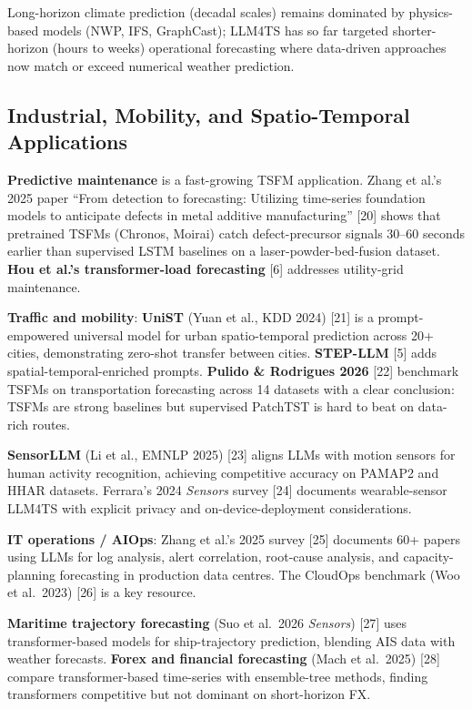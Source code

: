 Long-horizon climate prediction (decadal scales) remains dominated by physics-based models (NWP, IFS, GraphCast); LLM4TS has so far targeted shorter-horizon (hours to weeks) operational forecasting where data-driven approaches now match or exceed numerical weather prediction.

\subsection{Industrial, Mobility, and Spatio-Temporal Applications}\label{industrial-mobility-and-spatio-temporal-applications}

\textbf{Predictive maintenance} is a fast-growing TSFM application. Zhang et al.'s 2025 paper ``From detection to forecasting: Utilizing time-series foundation models to anticipate defects in metal additive manufacturing'' {[}20{]} shows that pretrained TSFMs (Chronos, Moirai) catch defect-precursor signals 30--60 seconds earlier than supervised LSTM baselines on a laser-powder-bed-fusion dataset. \textbf{Hou et al.'s transformer-load forecasting} {[}6{]} addresses utility-grid maintenance.

\textbf{Traffic and mobility}: \textbf{UniST} (Yuan et al., KDD 2024) {[}21{]} is a prompt-empowered universal model for urban spatio-temporal prediction across 20+ cities, demonstrating zero-shot transfer between cities. \textbf{STEP-LLM} {[}5{]} adds spatial-temporal-enriched prompts. \textbf{Pulido \& Rodrigues 2026} {[}22{]} benchmark TSFMs on transportation forecasting across 14 datasets with a clear conclusion: TSFMs are strong baselines but supervised PatchTST is hard to beat on data-rich routes.

\textbf{SensorLLM} (Li et al., EMNLP 2025) {[}23{]} aligns LLMs with motion sensors for human activity recognition, achieving competitive accuracy on PAMAP2 and HHAR datasets. Ferrara's 2024 \emph{Sensors} survey {[}24{]} documents wearable-sensor LLM4TS with explicit privacy and on-device-deployment considerations.

\textbf{IT operations / AIOps}: Zhang et al.'s 2025 survey {[}25{]} documents 60+ papers using LLMs for log analysis, alert correlation, root-cause analysis, and capacity-planning forecasting in production data centres. The CloudOps benchmark (Woo et al.~2023) {[}26{]} is a key resource.

\textbf{Maritime trajectory forecasting} (Suo et al.~2026 \emph{Sensors}) {[}27{]} uses transformer-based models for ship-trajectory prediction, blending AIS data with weather forecasts. \textbf{Forex and financial forecasting} (Mach et al.~2025) {[}28{]} compare transformer-based time-series with ensemble-tree methods, finding transformers competitive but not dominant on short-horizon FX.

